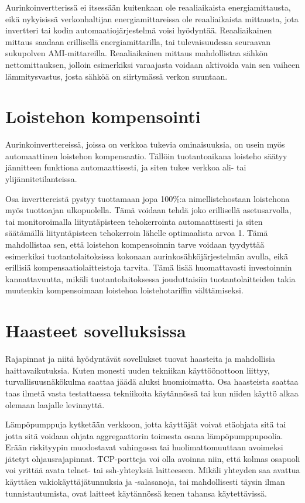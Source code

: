   Aurinkoinvertterissä ei itsessään kuitenkaan ole reaaliaikaista energiamittausta, eikä nykyisissä verkonhaltijan energiamittareissa ole reaaliaikaista mittausta, jota invertteri tai kodin automaatiojärjestelmä voisi hyödyntää. Reaaliaikainen mittaus saadaan erillisellä energiamittarilla, tai tulevaisuudessa seuraavan sukupolven AMI-mittareilla. Reaaliaikainen mittaus mahdollistaa sähkön nettomittauksen, jolloin esimerkiksi varaajasta voidaan aktivoida vain sen vaiheen lämmitysvastus, josta sähköä on siirtymässä verkon suuntaan.

\section{Loistehon kompensointi}
  Aurinkoinverttereissä, joissa on verkkoa tukevia ominaisuuksia, on usein myös automaattinen loistehon kompensaatio. Tällöin tuotantoaikana loisteho säätyy jännitteen funktiona automaattisesti, ja siten tukee verkkoa ali- tai ylijännitetilanteissa.

  Osa inverttereistä pystyy tuottamaan jopa 100\%:a nimellistehostaan loistehona myös tuottoajan ulkopuolella. Tämä voidaan tehdä joko erillisellä asetusarvolla, tai monitoroimalla liityntäpisteen tehokerrointa automaattisesti ja siten säätämällä liityntäpisteen tehokerroin lähelle optimaalista arvoa 1. Tämä mahdollistaa sen, että loistehon kompensoinnin tarve voidaan tyydyttää esimerkiksi tuotantolaitoksissa kokonaan aurinkosähköjärjestelmän avulla, eikä erillisiä kompensaatiolaitteistoja tarvita. Tämä lisää huomattavasti investoinnin kannattavuutta, mikäli tuotantolaitoksessa jouduttaisiin tuotantolaitteiden takia muutenkin kompensoimaan loistehoa loistehotariffin välttämiseksi.

\section{Haasteet sovelluksissa}

  Rajapinnat ja niitä hyödyntävät sovellukset tuovat haasteita ja mahdollisia haittavaikutuksia. Kuten monesti uuden tekniikan käyttöönottoon liittyy, turvallisuusnäkökulma saattaa jäädä aluksi huomioimatta. Osa haasteista saattaa taas ilmetä vasta testattaessa tekniikoita käytännössä tai kun niiden käyttö alkaa olemaan laajalle levinnyttä.

  Lämpöpumppuja kytketään verkkoon, jotta käyttäjät voivat etäohjata sitä tai jotta sitä voidaan ohjata aggregaattorin toimesta osana lämpöpumppupoolia. Erään riskityypin muodostavat vahingossa tai huolimattomuuttaan avoimeksi jätetyt ohjausrajapinnat. TCP-portteja voi olla avoinna niin, että kolmas osapuoli voi yrittää avata telnet- tai ssh-yhteyksiä laitteeseen. Mikäli yhteyden saa avattua käyttäen vakiokäyttäjätunnuksia ja -salasanoja, tai mahdollisesti täysin ilman tunnistautumista, ovat laitteet käytännössä kenen tahansa käytettävissä.

